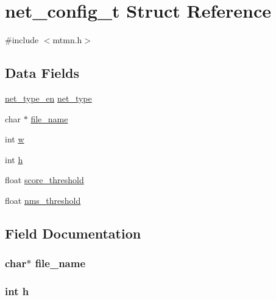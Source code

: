 \hypertarget{structnet__config__t}{}\section{net\+\_\+config\+\_\+t Struct Reference}
\label{structnet__config__t}


{\ttfamily \#include $<$mtmn.\+h$>$}

\subsection*{Data Fields}
\begin{DoxyCompactItemize}
\item 
\hyperlink{mtmn_8h_a9eb3d74ee60112199ec78344b3a4655e}{net\+\_\+type\+\_\+en} \hyperlink{structnet__config__t_a8f4c2af8911d60345894c9b1cd728a81}{net\+\_\+type}
\item 
char $\ast$ \hyperlink{structnet__config__t_a8505c513bc640d1f69e5f76fb32b24a8}{file\+\_\+name}
\item 
int \hyperlink{structnet__config__t_aac374e320caaadeca4874add33b62af2}{w}
\item 
int \hyperlink{structnet__config__t_a16611451551e3d15916bae723c3f59f7}{h}
\item 
float \hyperlink{structnet__config__t_ace479cfe5e33dac6639cf88d0551b58c}{score\+\_\+threshold}
\item 
float \hyperlink{structnet__config__t_a363bfab5175aae09f069a69ff5072f2c}{nms\+\_\+threshold}
\end{DoxyCompactItemize}


\subsection{Field Documentation}
\subsubsection[{\texorpdfstring{file\+\_\+name}{file_name}}]{\setlength{\rightskip}{0pt plus 5cm}char$\ast$ file\+\_\+name}\hypertarget{structnet__config__t_a8505c513bc640d1f69e5f76fb32b24a8}{}\label{structnet__config__t_a8505c513bc640d1f69e5f76fb32b24a8}
\subsubsection[{\texorpdfstring{h}{h}}]{\setlength{\rightskip}{0pt plus 5cm}int h}\hypertarget{structnet__config__t_a16611451551e3d15916bae723c3f59f7}{}\label{structnet__config__t_a16611451551e3d15916bae723c3f59f7}
